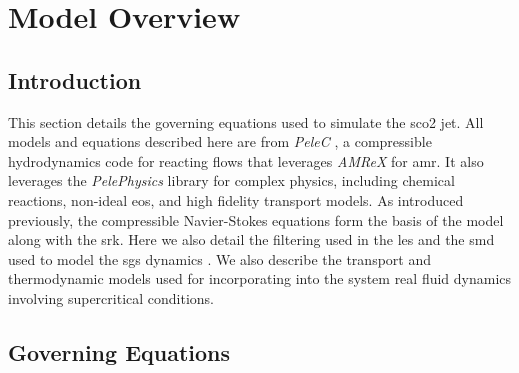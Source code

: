 \chapter{Model Overview}
\section{Introduction}
This section details the governing equations used to simulate the \gls{sco2} jet. All models and equations described here are from \textit{PeleC} \cite{PeleC1, PeleC2}, a compressible hydrodynamics code for reacting flows that leverages \textit{AMReX} \cite{amrex1, amrex2, amrex3} for \gls{amr}. It also leverages the \textit{PelePhysics} library for complex physics, including chemical reactions, non-ideal \gls{eos}, and high fidelity transport models. As introduced previously, the compressible Navier-Stokes equations form the basis of the model along with the \gls{srk}. Here we also detail the filtering used in the \gls{les} and the \gls{smd} used to model the \gls{sgs} dynamics \cite{LES_Comp}. We also describe the transport and thermodynamic models used for incorporating into the system real fluid dynamics involving supercritical conditions. 


\section{Governing Equations}

